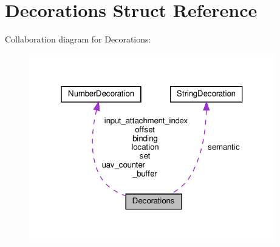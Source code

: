 \hypertarget{structDecorations}{}\section{Decorations Struct Reference}
\label{structDecorations}


Collaboration diagram for Decorations\+:\nopagebreak
\begin{figure}[H]
\begin{center}
\leavevmode
\includegraphics[width=304pt]{structDecorations__coll__graph}
\end{center}
\end{figure}
